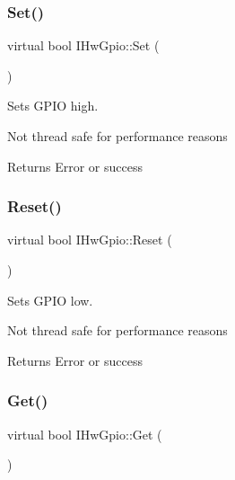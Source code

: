 \subsubsection{\texorpdfstring{Set()}{Set()}}
{\footnotesize\ttfamily virtual bool I\+Hw\+Gpio\+::\+Set (\begin{DoxyParamCaption}{ }\end{DoxyParamCaption})\hspace{0.3cm}{\ttfamily [pure virtual]}}



Sets G\+P\+IO high. 

Not thread safe for performance reasons \begin{DoxyReturn}{Returns}
Error or success 
\end{DoxyReturn}
\mbox{\label{classIHwGpio_a3f2a363ba55761a88877e8f4dff44701}} 
\subsubsection{\texorpdfstring{Reset()}{Reset()}}
{\footnotesize\ttfamily virtual bool I\+Hw\+Gpio\+::\+Reset (\begin{DoxyParamCaption}{ }\end{DoxyParamCaption})\hspace{0.3cm}{\ttfamily [pure virtual]}}



Sets G\+P\+IO low. 

Not thread safe for performance reasons \begin{DoxyReturn}{Returns}
Error or success 
\end{DoxyReturn}
\mbox{\label{classIHwGpio_a23b3d77fdae406d5fce9d3be3ea56363}} 
\subsubsection{\texorpdfstring{Get()}{Get()}}
{\footnotesize\ttfamily virtual bool I\+Hw\+Gpio\+::\+Get (\begin{DoxyParamCaption}{ }\end{DoxyParamCaption})\hspace{0.3cm}{\ttfamily [pure virtual]}}



